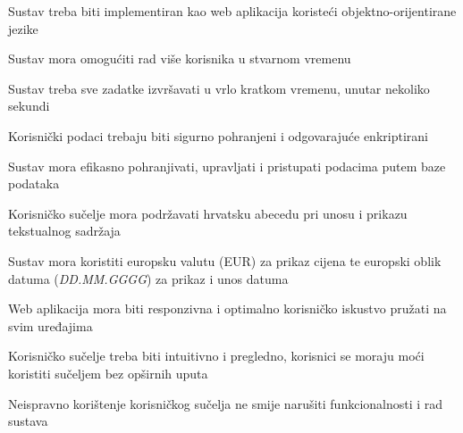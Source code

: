	\begin{packed_item}
		\item Sustav treba biti implementiran kao web aplikacija koristeći objektno-orijentirane jezike 
		\item Sustav mora omogućiti rad više korisnika u stvarnom vremenu 
		\item Sustav treba sve zadatke izvršavati u vrlo kratkom vremenu, unutar nekoliko sekundi
		\item Korisnički podaci trebaju biti sigurno pohranjeni i odgovarajuće enkriptirani
		\item Sustav mora efikasno pohranjivati, upravljati i pristupati podacima putem baze podataka 
		\item Korisničko sučelje mora podržavati hrvatsku abecedu pri unosu i prikazu tekstualnog sadržaja
		\item Sustav mora koristiti europsku valutu (EUR) za prikaz cijena te europski oblik datuma (\textit{DD.MM.GGGG}) za prikaz i unos datuma
		\item Web aplikacija mora biti responzivna i optimalno korisničko iskustvo pružati na svim uređajima
		\item Korisničko sučelje treba biti intuitivno i pregledno, korisnici se moraju moći koristiti sučeljem bez opširnih uputa
		\item Neispravno korištenje korisničkog sučelja ne smije narušiti funkcionalnosti i rad sustava
		
		
	\end{packed_item}
	
	
